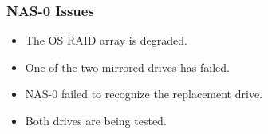 \documentclass{beamer}
\begin{document}


\begin{frame}

  \frametitle{NAS-0 Issues}

  \begin{itemize}
    \item The OS RAID array is degraded.
    \item One of the two mirrored drives has failed.
    \item NAS-0 failed to recognize the replacement drive.
    \item Both drives are being tested.
  \end{itemize}

\end{frame}

\end{document}
